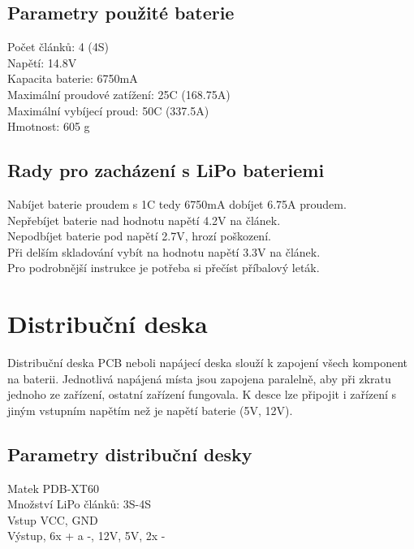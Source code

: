 \subsection{Parametry použité baterie} 
Počet článků: 4 (4S)\\
Napětí: 14.8V\\
Kapacita baterie: 6750mA\\
Maximální proudové zatížení: 25C (168.75A)\\
Maximální vybíjecí proud: 50C (337.5A)\\
Hmotnost: 605 g\\

\subsection{Rady pro zacházení s LiPo bateriemi} 
Nabíjet baterie proudem s 1C tedy 6750mA dobíjet 6.75A proudem.\\
Nepřebíjet baterie nad hodnotu napětí 4.2V na článek.\\
Nepodbíjet baterie pod napětí 2.7V, hrozí poškození.\\
Při delším skladování vybít na hodnotu napětí 3.3V na článek.\\
Pro podrobnější instrukce je potřeba si přečíst příbalový leták.\\

\section{Distribuční deska} 
Distribuční deska PCB neboli napájecí deska slouží k zapojení všech  komponent na baterii. Jednotlivá napájená místa jsou zapojena paralelně, aby při zkratu jednoho ze zařízení, ostatní zařízení fungovala. K desce lze připojit i zařízení s jiným vstupním napětím než je napětí baterie (5V, 12V).

\subsection{Parametry distribuční desky}
Matek PDB-XT60\\
Množství LiPo článků: 3S-4S\\
Vstup VCC, GND\\
Výstup, 6x + a -, 12V, 5V, 2x -\\

